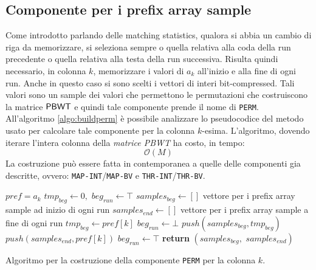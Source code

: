 \subsection{Componente per i prefix array sample}
Come introdotto parlando delle matching statistics, qualora si abbia un
cambio di riga da memorizzare, si seleziona sempre o quella relativa alla coda
della run precedente o quella relativa alla testa della run successiva. Risulta
quindi necessario, in colonna $k$, memorizzare i valori di $a_k$ all'inizio e
alla fine di ogni run. Anche in questo caso si sono scelti i vettori di interi
bit-compressed. Tali valori sono un sample dei valori che permettono
le permutazioni che costruiscono la matrice $\mbox{\rm {\sf PBWT}}$ e quindi tale
componente prende il nome di \texttt{PERM}.\\
All'algoritmo \ref{algo:buildperm} è possibile analizzare lo pseudocodice del
metodo usato per calcolare tale componente per la colonna
$k$-esima. L'algoritmo, dovendo iterare l'intera colonna della \textit{matrice
  PBWT} ha costo, in tempo:
\begin{equation}
  \label{eq:timeperm}
  \mathcal{O}(M)
\end{equation}
La costruzione può essere fatta in contemporanea a quelle delle componenti gia
descritte, ovvero: 
\texttt{MAP-INT}/\texttt{MAP-BV} e \texttt{THR-INT}/\texttt{THR-BV}.
\begin{algorithm}
  \small
  \begin{algorithmic}[1]
    \Comment $pref = a_k$
    \State $tmp_{beg}\gets 0,\,\,beg_{run}\gets \top$
    \State $samples_{beg} \gets []$
    \Comment vettore per i prefix array sample ad inizio di ogni run
    \State $samples_{end}\gets []$
    \Comment vettore per i prefix array sample a fine di ogni run
    \For {\textit{every} $k\in\left[0,\,\, height\right)$}
    \State $tmp_{beg}\gets pref[k]$
    \State $beg_{run}\gets \bot$
    \EndIf
    \State $push(samples_{beg}, tmp_{beg})$
    \State $push(samples_{end}, pref[k])$
    \State $beg_{run}\gets \top$
    \EndIf
    \EndFor
    \State \textbf{return} $(samples_{beg},\,\, samples_{end})$  
    \EndFunction
  \end{algorithmic}
  \caption{{\footnotesize{Algoritmo per la costruzione della componente
  \texttt{PERM} per la colonna $k$.}}}
  \label{algo:buildperm}
\end{algorithm}
